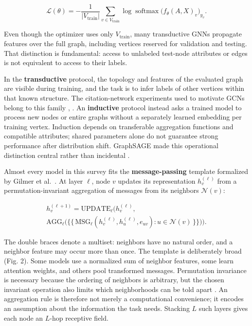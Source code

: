 \documentclass[conference]{IEEEtran}
\begin{document}
\[\mathcal{L}(\theta) = -\frac{1}{|V_{\text{train}}|}\sum_{v\in V_{\text{train}}} \log \operatorname{softmax}\big(f_\theta(A,X)_v\big)_{y_v}. \tag{1}\]

Even though the optimizer uses only \(V_{\text{train}}\), many transductive GNNs propagate features over the full graph, including vertices reserved for validation and testing. That distinction is fundamental: access to unlabeled test-node attributes or edges is not equivalent to access to their labels.

In the \textbf{transductive} protocol, the topology and features of the evaluated graph are visible during training, and the task is to infer labels of other vertices within that known structure. The citation-network experiments used to motivate GCNs belong to this family \cite{b1}, \cite{b12}. An \textbf{inductive} protocol instead asks a trained model to process new nodes or entire graphs without a separately learned embedding per training vertex. Induction depends on transferable aggregation functions and compatible attributes; shared parameters alone do not guarantee strong performance after distribution shift. GraphSAGE made this operational distinction central rather than incidental \cite{b2}.

Almost every model in this survey fits the \textbf{message-passing} template formalized by Gilmer et al.~\cite{b11}. At layer \(\ell\), node \(v\) updates its representation \(h_v^{(\ell)}\) from a permutation-invariant aggregation of messages from its neighbors \(\mathcal{N}(v)\):

\[\begin{gathered}h_v^{(\ell+1)} = \mathrm{UPDATE}_\ell\Big(h_v^{(\ell)}, \\ \mathrm{AGG}_\ell\big(\{\!\{\, \mathrm{MSG}_\ell(h_v^{(\ell)}, h_u^{(\ell)}, e_{uv}) : u\in\mathcal{N}(v)\,\}\!\}\big)\Big).\end{gathered}\tag{2}\]

The double braces denote a multiset: neighbors have no natural order, and a neighbor feature may occur more than once. The template is deliberately broad (Fig. 2). Some models use a normalized sum of neighbor features, some learn attention weights, and others pool transformed messages. Permutation invariance is necessary because the ordering of neighbors is arbitrary, but the chosen invariant operation also limits which neighborhoods can be told apart \cite{b4}. An aggregation rule is therefore not merely a computational convenience; it encodes an assumption about the information the task needs. Stacking \(L\) such layers gives each node an \(L\)-hop receptive field.
\end{document}
